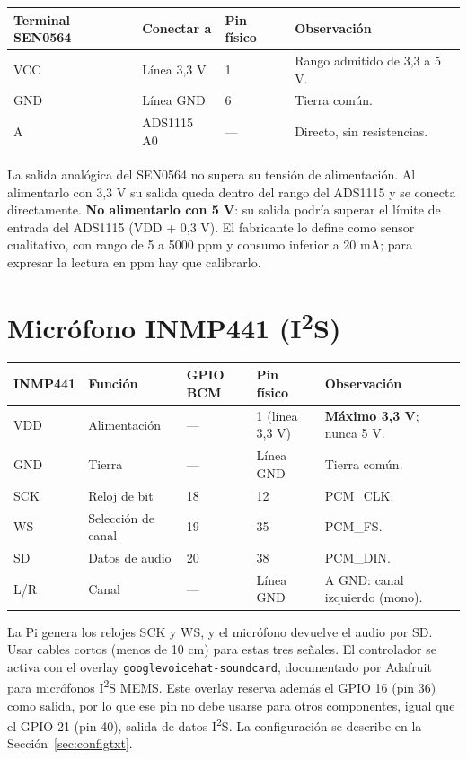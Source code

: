 \documentclass[11pt,a4paper]{article}
\newcommand{\iis}{I\textsuperscript{2}S}
\begin{document}
\begin{center}
\begin{tabularx}{\linewidth}{lllX}
\toprule
\textbf{Terminal SEN0564} & \textbf{Conectar a} & \textbf{Pin físico} & \textbf{Observación}\\
\midrule
VCC & Línea 3,3 V & 1 & Rango admitido de 3,3 a 5 V.\\
GND & Línea GND & 6 & Tierra común.\\
A & ADS1115 A0 & --- & Directo, sin resistencias.\\
\bottomrule
\end{tabularx}
\end{center}

La salida analógica del SEN0564 no supera su tensión de alimentación. Al
alimentarlo con 3,3 V su salida queda dentro del rango del ADS1115 y se conecta
directamente. \textbf{No alimentarlo con 5 V}: su salida podría superar el
límite de entrada del ADS1115 (VDD + 0,3 V).\cite{ads} El fabricante lo define
como sensor cualitativo, con rango de 5 a 5000 ppm y consumo inferior a
20 mA; para expresar la lectura en ppm hay que calibrarlo.\cite{sen0564}

\section{Micrófono INMP441 (\texorpdfstring{I\textsuperscript{2}S}{I2S})}
\label{sec:mic}

\begin{center}
\begin{tabularx}{\linewidth}{llllX}
\toprule
\textbf{INMP441} & \textbf{Función} & \textbf{GPIO BCM} & \textbf{Pin físico} & \textbf{Observación}\\
\midrule
VDD & Alimentación & --- & 1 (línea 3,3 V) & \textbf{Máximo 3,3 V}; nunca 5 V.\\
GND & Tierra & --- & Línea GND & Tierra común.\\
SCK & Reloj de bit & 18 & 12 & PCM\_CLK.\\
WS & Selección de canal & 19 & 35 & PCM\_FS.\\
SD & Datos de audio & 20 & 38 & PCM\_DIN.\\
L/R & Canal & --- & Línea GND & A GND: canal izquierdo (mono).\\
\bottomrule
\end{tabularx}
\end{center}

La Pi genera los relojes SCK y WS, y el micrófono devuelve el audio por SD. Usar
cables cortos (menos de 10 cm) para estas tres señales. El controlador se
activa con el overlay \texttt{googlevoicehat-soundcard}, documentado por
Adafruit para micrófonos \iis{} MEMS.\cite{inmp441,adafruit-i2s} Este overlay reserva
además el GPIO 16 (pin 36) como salida, por lo que ese pin no debe usarse para
otros componentes, igual que el GPIO 21 (pin 40), salida de datos \iis.\cite{overlays}
La configuración se describe en la Sección~\ref{sec:configtxt}.
\end{document}

